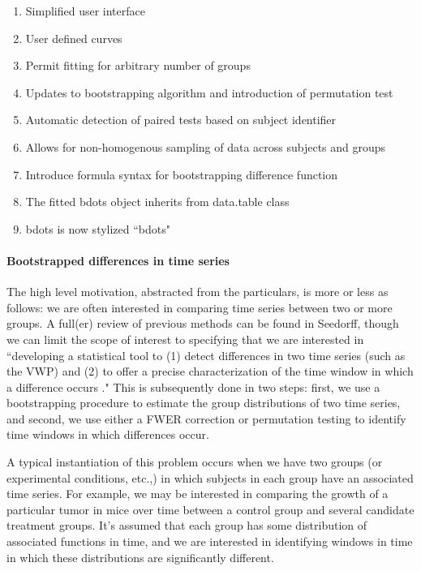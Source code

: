 \documentclass{article}
\begin{document}
\begin{enumerate}
\item Simplified user interface
\item User defined curves
\item Permit fitting for arbitrary number of groups
\item Updates to bootstrapping algorithm and introduction of permutation test
\item Automatic detection of paired tests based on subject identifier
\item Allows for non-homogenous sampling of data across subjects and groups
\item Introduce formula syntax for bootstrapping difference function
\item The fitted bdots object inherits from data.table class
\item bdots is now stylized ``bdots"
\end{enumerate}

\paragraph{Bootstrapped differences in time series}

The high level motivation, abstracted from the particulars, is more or less as follows: we are often interested in comparing time series between two or more groups. A full(er) review of previous methods can be found in Seedorff,  though we can limit the scope of interest to specifying that we are interested in ``developing a statistical tool to (1) detect differences in two time series (such as the VWP) and (2) to offer a precise characterization of the time window in which a difference occurs \cite{seedorff2018bdots}." This is subsequently done in two steps: first, we use a bootstrapping procedure to estimate the group distributions of two time series, and second, we use either a FWER correction or permutation testing to identify time windows in which differences occur.

A typical instantiation of this problem occurs when we have two groups (or experimental conditions, etc.,) in which subjects in each group have an associated time series. For example, we may be interested in comparing the growth of a particular tumor in mice over time between a control group and several candidate treatment groups. It's assumed that each group has some distribution of associated functions in time, and we are interested in identifying windows in time in which these distributions are significantly different.
\end{document}
